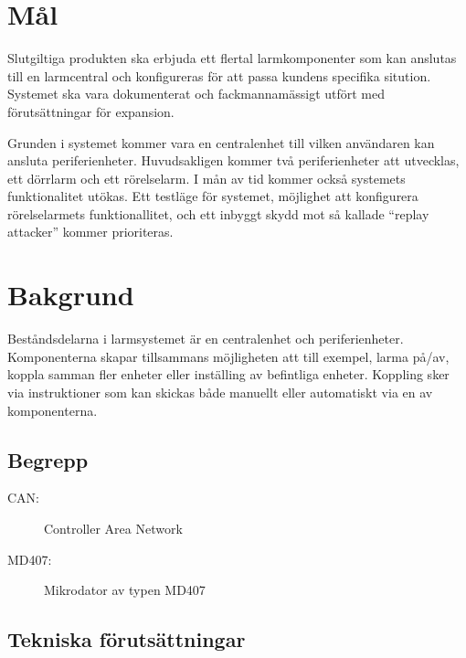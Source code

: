 \documentclass[a4paper]{article}
\begin{document}
\section{Mål}


Slutgiltiga produkten ska erbjuda ett flertal larmkomponenter som kan anslutas till en larmcentral och konfigureras för att passa kundens specifika sitution. Systemet ska vara dokumenterat och fackmannamässigt utfört med förutsättningar för expansion.

Grunden i systemet kommer vara en centralenhet till vilken användaren kan ansluta periferienheter. Huvudsakligen kommer två periferienheter att utvecklas, ett dörrlarm och ett rörelselarm. I mån av tid kommer också systemets funktionalitet utökas. Ett testläge för systemet, möjlighet att konfigurera rörelselarmets funktionallitet, och ett inbyggt skydd mot så kallade ``replay attacker'' kommer prioriteras.


\section{Bakgrund}

Beståndsdelarna i larmsystemet är en centralenhet och periferienheter. Komponenterna skapar tillsammans möjligheten att till exempel, larma på/av, koppla samman fler enheter eller inställing av befintliga enheter. Koppling sker via instruktioner som kan skickas både manuellt eller automatiskt via en av komponenterna.

\subsection{Begrepp}

\begin{description}
    \item[CAN:] Controller Area Network
    \item[MD407:] Mikrodator av typen MD407
\end{description}


\subsection{Tekniska förutsättningar}
\end{document}
